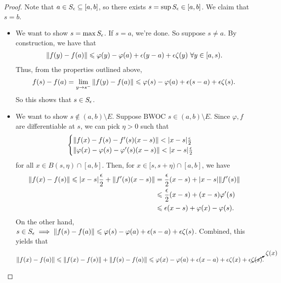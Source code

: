 \documentclass{report}
\begin{document}
\begin{proof}
    Note that $a \in S_\epsilon \subseteq[a,b]$, so there exists $s = \sup S_\epsilon \in [a,b]$. We claim that $s = b$. 
    \begin{itemize}
        \item We want to show $s = \max S_\epsilon$. If $s = a$, we're done. So suppose $s \neq a$. By construction, we have that 
        \begin{align*}
            \Vert f(y) - f(a) \Vert \leqslant \varphi(y) - \varphi(a) + \epsilon(y-a) + \epsilon \zeta(y) \,\, \forall y \in [a,s).
        \end{align*}
        Thus, from the properties outlined above,
        \begin{align*}
            f(s) - f(a) = \lim_{y \to s^-}\Vert f(y) - f(a) \Vert \leqslant \varphi(s) - \varphi(a) + \epsilon(s-a) + \epsilon\zeta(s).
        \end{align*}
        So this shows that $s \in S_\epsilon$.
        \item We want to show $s\notin (a,b) \setminus E$. Suppose BWOC $s \in (a,b) \setminus E$. Since $\varphi,f$ are differentiable at $s$, we can pick $\eta > 0$ such that 
        \begin{align*}
            \begin{cases}
                \Vert f(x) - f(s) - f'(s)(x-s) \Vert < |x-s| \frac {\epsilon} 2 \\
                \Vert \varphi(x) - \varphi(s) - \varphi'(s)(x-s) \Vert < |x-s| \frac {\epsilon} 2
            \end{cases}
        \end{align*}
        for all $x \in B(s, \eta) \cap [a,b]$. Then, for $x \in [s, s+\eta) \cap [a,b]$, we have 
        \begin{align*}
            \Vert f(x) - f(s) \Vert \leqslant |x-s| \frac {\epsilon} 2 + \Vert f'(s)(x-s)\Vert &= \frac {\epsilon} 2 (x-s) + |x-s|\Vert f'(s)\Vert \\
            &\leqslant \frac {\epsilon} 2 (x-s) + (x-s) \varphi'(s) \\
            &\leqslant \epsilon(x-s) + \varphi(x) - \varphi(s).
        \end{align*}
        On the other hand, $s \in S_\epsilon \implies \Vert f(s) - f(a) \Vert \leqslant \varphi(s) - \varphi(a) + \epsilon(s-a) + \epsilon\zeta(s)$. Combined, this yields that
        \begin{align*}
            \Vert f(x) - f(a) \Vert \leqslant \Vert f(x) - f(s)\Vert + \Vert f(s) - f(a)\Vert \leqslant \varphi(x) - \varphi(a) + \epsilon(x-a) + \epsilon\zeta(x) + \epsilon\cancelto{\zeta(x)}{\zeta(s)}.
        \end{align*}

\end{itemize}
\end{proof}
\end{document}
